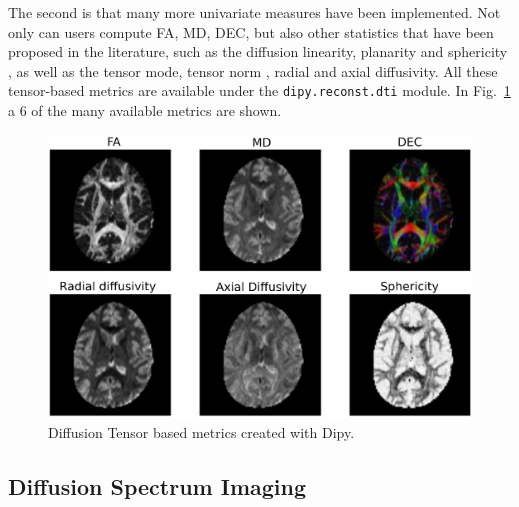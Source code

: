 \documentclass{bioinfo}
\begin{document}
The second is that many more univariate measures have been implemented. Not
only can users compute FA, MD, DEC, but also other statistics that have been
proposed in the literature, such as the diffusion linearity, planarity and
sphericity \citep{westin:97}, as well as the tensor mode, tensor norm
\cite{Ennis2006}, radial and axial diffusivity. All these tensor-based metrics
are available under the \texttt{dipy.reconst.dti} module. In Fig.~\ref{Fig:dti_metrics} a 6 of the many available metrics are shown.

\begin{figure}
\includegraphics[scale=0.45]{Figures/dti_metrics.eps}
\centering{}
\caption{Diffusion Tensor based metrics created with Dipy. \label{Fig:dti_metrics}}
\end{figure}

\subsection{Diffusion Spectrum Imaging}\label{dsi}
\end{document}

